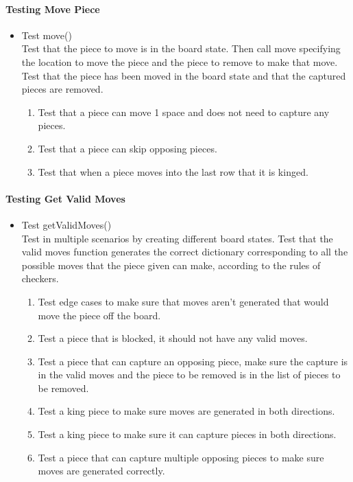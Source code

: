 \documentclass[12pt, titlepage]{article}
\begin{document}
\paragraph{Testing Move Piece}
\begin{itemize}
    \item Test move()\\
    Test that the piece to move is in the board state. Then call move specifying the location to move the piece and the piece to remove to make that move. Test that the piece has been moved in the board state and that the captured pieces are removed.
    \begin{enumerate}
        \item Test that a piece can move 1 space and does not need to capture any pieces.
        \item Test that a piece can skip opposing pieces.
        \item Test that when a piece moves into the last row that it is kinged.
    \end{enumerate}
\end{itemize}

\paragraph{Testing Get Valid Moves}
\begin{itemize}
    \item Test getValidMoves()\\
    Test in multiple scenarios by creating different board states. Test that the valid moves function generates the correct dictionary corresponding to all the possible moves that the piece given can make, according to the rules of checkers.
    \begin{enumerate}
        \item Test edge cases to make sure that moves aren't generated that would move the piece off the board.
        \item Test a piece that is blocked, it should not have any valid moves.
        \item Test a piece that can capture an opposing piece, make sure the capture is in the valid moves and the piece to be removed is in the list of pieces to be removed.
        \item Test a king piece to make sure moves are generated in both directions.
        \item Test a king piece to make sure it can capture pieces in both directions.
        \item Test a piece that can capture multiple opposing pieces to make sure moves are generated correctly.
    \end{enumerate}
\end{itemize}
\end{document}
